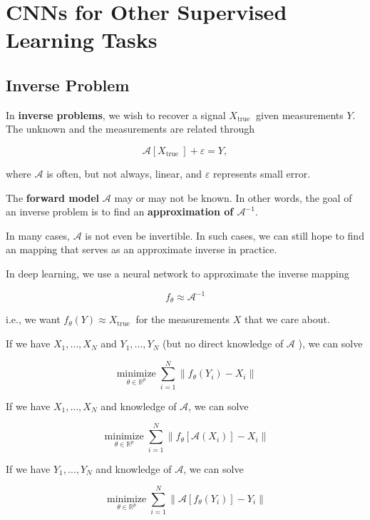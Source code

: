 \chapter{CNNs for Other Supervised Learning Tasks}

\section{Inverse Problem}

\begin{definition}
    In \textbf{inverse problems}, we wish to recover a signal $X_{\text {true }}$ given measurements $Y$. The unknown and the measurements are related through

    $$
    \mathcal{A}\left[X_{\text {true }}\right]+\varepsilon=Y,
    $$

    where $\mathcal{A}$ is often, but not always, linear, and $\varepsilon$ represents small error.

    The \textbf{forward model} $\mathcal{A}$ may or may not be known. In other words, the goal of an inverse problem is to find an \textbf{approximation of $\mathcal{A}^{-1}$}.

    In many cases, $\mathcal{A}$ is not even be invertible. In such cases, we can still hope to find an mapping that serves as an approximate inverse in practice.
\end{definition}

\begin{concept}
    In deep learning, we use a neural network to approximate the inverse mapping

    $$
    f_{\theta} \approx \mathcal{A}^{-1}
    $$

    i.e., we want $f_{\theta}(Y) \approx X_{\text {true }}$ for the measurements $X$ that we care about.

    If we have $X_{1}, \ldots, X_{N}$ and $Y_{1}, \ldots, Y_{N}$ (but no direct knowledge of $\mathcal{A}$ ), we can solve

    $$
    \underset{\theta \in \mathbb{R}^{p}}{\operatorname{minimize}} \sum_{i=1}^{N}\left\|f_{\theta}\left(Y_{i}\right)-X_{i}\right\|
    $$

    If we have $X_{1}, \ldots, X_{N}$ and knowledge of $\mathcal{A}$, we can solve

    $$
    \underset{\theta \in \mathbb{R}^{p}}{\operatorname{minimize}} \sum_{i=1}^{N}\left\|f_{\theta}\left[\mathcal{A}\left(X_{i}\right)\right]-X_{i}\right\|
    $$

    If we have $Y_{1}, \ldots, Y_{N}$ and knowledge of $\mathcal{A}$, we can solve

    $$
    \underset{\theta \in \mathbb{R}^{p}}{\operatorname{minimize}} \sum_{i=1}^{N}\left\|\mathcal{A}\left[f_{\theta}\left(Y_{i}\right)\right]-Y_{i}\right\|
    $$
\end{concept}

